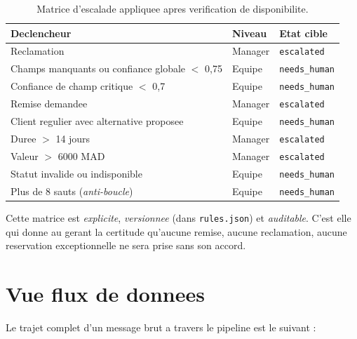 \documentclass[12pt,a4paper,openany]{report}
\begin{document}
\begin{table}[H]\centering\small
\caption{Matrice d'escalade appliquee apres verification de disponibilite.}
\label{tab:escalade}
\begin{tabularx}{\textwidth}{X l l}\toprule
\rowcolor{boxBlue!30}\textbf{Declencheur} & \textbf{Niveau} & \textbf{Etat cible}\\\midrule
Reclamation                                       & Manager & \texttt{escalated}\\
Champs manquants ou confiance globale $<$ 0{,}75  & Equipe  & \texttt{needs\_human}\\
Confiance de champ critique $<$ 0{,}7             & Equipe  & \texttt{needs\_human}\\
Remise demandee                                   & Manager & \texttt{escalated}\\
Client regulier avec alternative proposee         & Equipe  & \texttt{needs\_human}\\
Duree $>$ 14 jours                                & Manager & \texttt{escalated}\\
Valeur $>$ 6000 MAD                               & Manager & \texttt{escalated}\\
Statut invalide ou indisponible                   & Equipe  & \texttt{needs\_human}\\
Plus de 8 sauts (\emph{anti-boucle})              & Equipe  & \texttt{needs\_human}\\
\bottomrule
\end{tabularx}
\end{table}

Cette matrice est \emph{explicite}, \emph{versionnee} (dans \texttt{rules.json}) et \emph{auditable}. C'est elle qui donne au gerant la certitude qu'aucune remise, aucune reclamation, aucune reservation exceptionnelle ne sera prise sans son accord.

\section{Vue flux de donnees}

Le trajet complet d'un message brut a travers le pipeline est le suivant :
\end{document}
